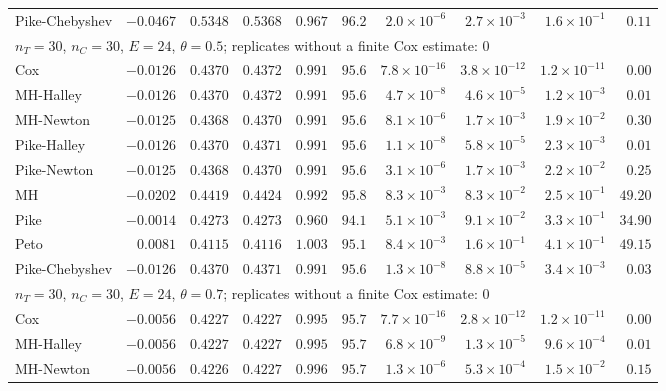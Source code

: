 \begin{landscape}
\begin{longtable}{lrrrrrrrrr}
Pike-Chebyshev & $-0.0467$ & $0.5348$ & $0.5368$ & $0.967$ & $96.2$ & $2.0 \times 10^{-6}$ & $2.7 \times 10^{-3}$ & $1.6 \times 10^{-1}$ & $0.11$ \\
\multicolumn{10}{l}{$n_T = 30$, $n_C = 30$, $E = 24$, $\theta = 0.5$; replicates without a finite Cox estimate: 0} \\
Cox & $-0.0126$ & $0.4370$ & $0.4372$ & $0.991$ & $95.6$ & $7.8 \times 10^{-16}$ & $3.8 \times 10^{-12}$ & $1.2 \times 10^{-11}$ & $0.00$ \\
MH-Halley & $-0.0126$ & $0.4370$ & $0.4372$ & $0.991$ & $95.6$ & $4.7 \times 10^{-8}$ & $4.6 \times 10^{-5}$ & $1.2 \times 10^{-3}$ & $0.01$ \\
MH-Newton & $-0.0125$ & $0.4368$ & $0.4370$ & $0.991$ & $95.6$ & $8.1 \times 10^{-6}$ & $1.7 \times 10^{-3}$ & $1.9 \times 10^{-2}$ & $0.30$ \\
Pike-Halley & $-0.0126$ & $0.4370$ & $0.4371$ & $0.991$ & $95.6$ & $1.1 \times 10^{-8}$ & $5.8 \times 10^{-5}$ & $2.3 \times 10^{-3}$ & $0.01$ \\
Pike-Newton & $-0.0125$ & $0.4368$ & $0.4370$ & $0.991$ & $95.6$ & $3.1 \times 10^{-6}$ & $1.7 \times 10^{-3}$ & $2.2 \times 10^{-2}$ & $0.25$ \\
MH & $-0.0202$ & $0.4419$ & $0.4424$ & $0.992$ & $95.8$ & $8.3 \times 10^{-3}$ & $8.3 \times 10^{-2}$ & $2.5 \times 10^{-1}$ & $49.20$ \\
Pike & $-0.0014$ & $0.4273$ & $0.4273$ & $0.960$ & $94.1$ & $5.1 \times 10^{-3}$ & $9.1 \times 10^{-2}$ & $3.3 \times 10^{-1}$ & $34.90$ \\
Peto & $0.0081$ & $0.4115$ & $0.4116$ & $1.003$ & $95.1$ & $8.4 \times 10^{-3}$ & $1.6 \times 10^{-1}$ & $4.1 \times 10^{-1}$ & $49.15$ \\
Pike-Chebyshev & $-0.0126$ & $0.4370$ & $0.4371$ & $0.991$ & $95.6$ & $1.3 \times 10^{-8}$ & $8.8 \times 10^{-5}$ & $3.4 \times 10^{-3}$ & $0.03$ \\
\multicolumn{10}{l}{$n_T = 30$, $n_C = 30$, $E = 24$, $\theta = 0.7$; replicates without a finite Cox estimate: 0} \\
Cox & $-0.0056$ & $0.4227$ & $0.4227$ & $0.995$ & $95.7$ & $7.7 \times 10^{-16}$ & $2.8 \times 10^{-12}$ & $1.2 \times 10^{-11}$ & $0.00$ \\
MH-Halley & $-0.0056$ & $0.4227$ & $0.4227$ & $0.995$ & $95.7$ & $6.8 \times 10^{-9}$ & $1.3 \times 10^{-5}$ & $9.6 \times 10^{-4}$ & $0.01$ \\
MH-Newton & $-0.0056$ & $0.4226$ & $0.4227$ & $0.996$ & $95.7$ & $1.3 \times 10^{-6}$ & $5.3 \times 10^{-4}$ & $1.5 \times 10^{-2}$ & $0.15$ \\

\end{longtable}
\end{landscape}
